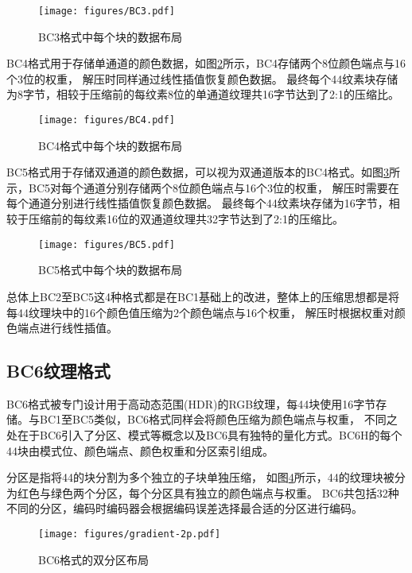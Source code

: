 \begin{figure}[htbp]
    \centering
    \texttt{[image: figures/BC3.pdf]}
    \caption{BC3格式中每个块的数据布局\cite{BC1-5}}
    \label{fig:BC3}
\end{figure}

BC4格式用于存储单通道的颜色数据，如图\ref{fig:BC4}所示，BC4存储两个8位颜色端点与16个3位的权重，
解压时同样通过线性插值恢复颜色数据。
最终每个4\times4纹素块存储为8字节，相较于压缩前的每纹素8位的单通道纹理共16字节达到了2:1的压缩比。

\begin{figure}[htbp]
    \centering
    \texttt{[image: figures/BC4.pdf]}
    \caption{BC4格式中每个块的数据布局\cite{BC1-5}}
    \label{fig:BC4}
\end{figure}

BC5格式用于存储双通道的颜色数据，可以视为双通道版本的BC4格式。如图\ref{fig:BC5}所示，BC5对每个通道分别存储两个8位颜色端点与16个3位的权重，
解压时需要在每个通道分别进行线性插值恢复颜色数据。
最终每个4\times4纹素块存储为16字节，相较于压缩前的每纹素16位的双通道纹理共32字节达到了2:1的压缩比。

\begin{figure}[htbp]
    \centering
    \texttt{[image: figures/BC5.pdf]}
    \caption{BC5格式中每个块的数据布局\cite{BC1-5}}
    \label{fig:BC5}
\end{figure}

总体上BC2至BC5这4种格式都是在BC1基础上的改进，整体上的压缩思想都是将每4\times4纹理块中的16个颜色值压缩为2个颜色端点与16个权重，
解压时根据权重对颜色端点进行线性插值。

\subsection{BC6纹理格式}

BC6格式被专门设计用于高动态范围(HDR)的RGB纹理，每4\times4块使用16字节存储。与BC1至BC5类似，BC6格式同样会将颜色压缩为颜色端点与权重，
不同之处在于BC6引入了分区、模式等概念以及BC6具有独特的量化方式。BC6H的每个4\times4块由模式位、颜色端点、颜色权重和分区索引组成。

分区是指将4\times4的块分割为多个独立的子块单独压缩，
如图\ref{fig:2-Partition}所示，4\times4的纹理块被分为红色与绿色两个分区，每个分区具有独立的颜色端点与权重。
BC6共包括32种不同的分区，编码时编码器会根据编码误差选择最合适的分区进行编码。

\begin{figure}[htbp]
    \centering
    \texttt{[image: figures/gradient-2p.pdf]}
    \caption{BC6格式的双分区布局\cite{ASTC}}
    \label{fig:2-Partition}
\end{figure}

